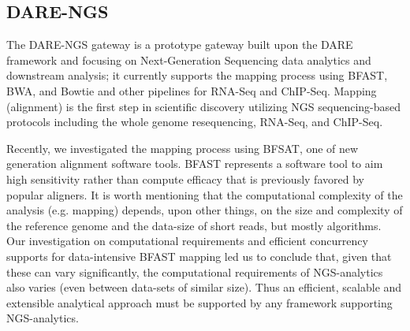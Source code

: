 \documentclass[]{svjour3}
\begin{document}

\subsection{DARE-NGS}
The DARE-NGS gateway %
is a prototype gateway built upon the DARE framework and focusing on Next-Generation Sequencing data analytics and downstream analysis; it currently supports the mapping
process using BFAST, BWA, and Bowtie and other pipelines for RNA-Seq and ChIP-Seq\cite{mardis2008-arghg,ecmls_ccpe10}. Mapping (alignment) is the first
step in scientific discovery utilizing NGS sequencing-based protocols
including the whole genome resequencing, RNA-Seq, and ChIP-Seq. 

Recently, we investigated the mapping process using BFSAT, one of new generation alignment software tools. BFAST represents a software tool to aim high sensitivity rather than compute efficacy that is previously favored by popular aligners. It is worth mentioning that the computational complexity of the
analysis (e.g. mapping) depends, upon other things, on the size and
complexity of the reference genome and the data-size of short reads, but mostly algorithms\cite{ecmls11}.
Our investigation on computational requirements and efficient concurrency supports for data-intensive BFAST mapping led us to conclude that, given that these can vary significantly, the computational
requirements of NGS-analytics also varies (even between data-sets of
similar size). Thus an efficient, scalable and extensible analytical
approach must be supported by any framework supporting NGS-analytics.

\end{document}
